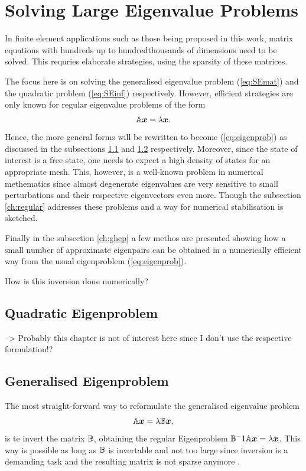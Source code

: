 \section{Solving Large Eigenvalue Problems}
In finite element applications such as those being proposed in this work, matrix equations with hundreds up to hundredthousands of dimensions need to be solved.
This requries elaborate strategies, using the sparsity of these matrices.

The focus here is on solving the generalised eigenvalue problem (\ref{eq:SEmat}) and the quadratic problem (\ref{eq:SEinf}) respectively.
However, efficient strategies are only known for regular eigenvalue problems of the form 
\begin{equation} \label{eq:eigenprob}
\mathbb{A}\bm{x}=\lambda\bm{x}.
\end{equation}
Hence, the more general forms will be rewritten to become (\ref{eq:eigenprob}) as discussed in the subsections \ref{ch:quadEV} and \ref{ch:GenEV} respectively.
Moreover, since the state of interest is a free state, one needs to expect a high density of states for an appropriate mesh. 
This, however, is a well-known problem in numerical methematics since almost degenerate eigenvalues are very sensitive to small perturbations and their respective eigenvectors even more.
Though the subsection \ref{ch:regular} addresses these problems and a way for numerical stabilisation is sketched.

Finally in the subsection \ref{ch:ghep} a few methos are presented showing how a small number of approximate eigenpairs can be obtained in a numerically efficient way from the usual eigenproblem (\ref{eq:eigenprob}).

How is this inversion done numerically?

\subsection{Quadratic Eigenproblem}
\label{ch:quadEV}
--> Probably this chapter is not of interest here since I don't use the respective formulation!?

\subsection{Generalised Eigenproblem}
\label{ch:GenEV}
The most straight-forward way to reformulate the generalised eigenvalue problem
\begin{equation} \label{eq:Gep}
\mathbb{A}\bm{x}=\lambda\mathbb{B}\bm{x},
\end{equation}
is te invert the matrix $\mathbb{B}$, obtaining the regular Eigenproblem $\mathbb{B}^-1\mathbb{A}\bm{x}=\lambda\bm{x}$.
This way is possible as long as $\mathbb{B}$ is invertable and not too large since inversion is a demanding task and the resulting matrix is not sparse anymore \cite{slepcManual}.

